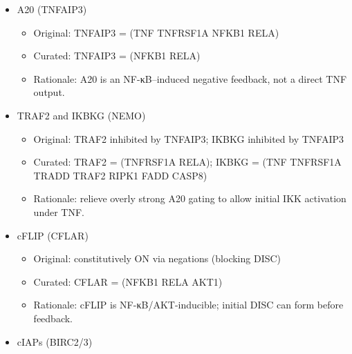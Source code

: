 \begin{itemize}
\begin{itemize}
    \begin{itemize}
    \tightlist
    \item
      Original: NFKBIA = (TRAF2 \textbar{} CASP3 \textbar{} IKBKG
      \textbar{} NFKB1) \& !(TNF \textbar{} TNFRSF1A \textbar{} RELA
      \textbar{} TNFAIP3)
    \item
      Curated: NFKBIA = (RELA \textbar{} NFKB1) \& !(IKBKB \& IKBKG \&
      CHUK)
    \end{itemize}
  \item
    Rationale: IKK complex (IKKβ/IKBKB, NEMO/IKBKG, IKKα/CHUK) activates
    NF-κB; IκBα is an NF-κB target and is degraded by IKK.
  \end{itemize}
\item
  A20 (TNFAIP3)

  \begin{itemize}
  \tightlist
  \item
    Original: TNFAIP3 = (TNF \textbar{} TNFRSF1A \textbar{} NFKB1
    \textbar{} RELA)
  \item
    Curated: TNFAIP3 = (NFKB1 \textbar{} RELA)
  \item
    Rationale: A20 is an NF-κB--induced negative feedback, not a direct
    TNF output.
  \end{itemize}
\item
  TRAF2 and IKBKG (NEMO)

  \begin{itemize}
  \tightlist
  \item
    Original: TRAF2 inhibited by TNFAIP3; IKBKG inhibited by TNFAIP3
  \item
    Curated: TRAF2 = (TNFRSF1A \textbar{} RELA); IKBKG = (TNF \textbar{}
    TNFRSF1A \textbar{} TRADD \textbar{} TRAF2 \textbar{} RIPK1
    \textbar{} FADD \textbar{} CASP8)
  \item
    Rationale: relieve overly strong A20 gating to allow initial IKK
    activation under TNF.
  \end{itemize}
\item
  cFLIP (CFLAR)

  \begin{itemize}
  \tightlist
  \item
    Original: constitutively ON via negations (blocking DISC)
  \item
    Curated: CFLAR = (NFKB1 \textbar{} RELA \textbar{} AKT1)
  \item
    Rationale: cFLIP is NF-κB/AKT-inducible; initial DISC can form
    before feedback.
  \end{itemize}
\item
  cIAPs (BIRC2/3)


\end{itemize}
